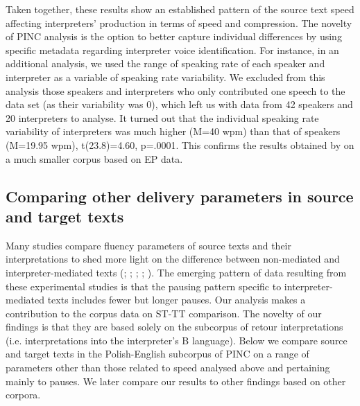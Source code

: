 \documentclass[output=paper]{langscibook}
\begin{document}
Taken together, these results show an established pattern of the source text speed affecting interpreters’ production in terms of speed and compression. The novelty of PINC analysis is the option to better capture individual differences by using specific metadata regarding interpreter voice identification. For instance, in an additional analysis, we used the range of speaking rate of each speaker and interpreter as a variable of speaking rate variability. We excluded from this analysis those speakers and interpreters who only contributed one speech to the data set (as their variability was 0), which left us with data from 42 speakers and 20 interpreters to analyse. It turned out that the individual speaking rate variability of interpreters was much higher (M=40 wpm) than that of speakers (M=19.95 wpm), t(23.8)=4.60, p=.0001. This confirms the results obtained by \citet{Christodoulides2013} on a much smaller corpus based on EP data.

\subsection{Comparing other delivery parameters in source and target texts}\label{sec:chmiel:3.2}

Many studies compare fluency parameters of source texts and their interpretations to shed more light on the difference between non-mediated and interpreter-mediated texts (\citealt{Ahrens2005}; \citealt{Cecot2001}; \citealt{Poechhacker1995}; \citealt{Tissi2000}; \citealt{WangLi2014}). The emerging pattern of data resulting from these experimental studies is that the pausing pattern specific to interpreter-mediated texts includes fewer but longer pauses. Our analysis makes a contribution to the corpus data on ST-TT comparison. The novelty of our findings is that they are based solely on the subcorpus of retour interpretations (i.e. interpretations into the interpreter’s B language). Below we compare source and target texts in the Polish-English subcorpus of PINC on a range of parameters other than those related to speed analysed above and pertaining mainly to pauses. We later compare our results to other findings based on other corpora.
\end{document}
